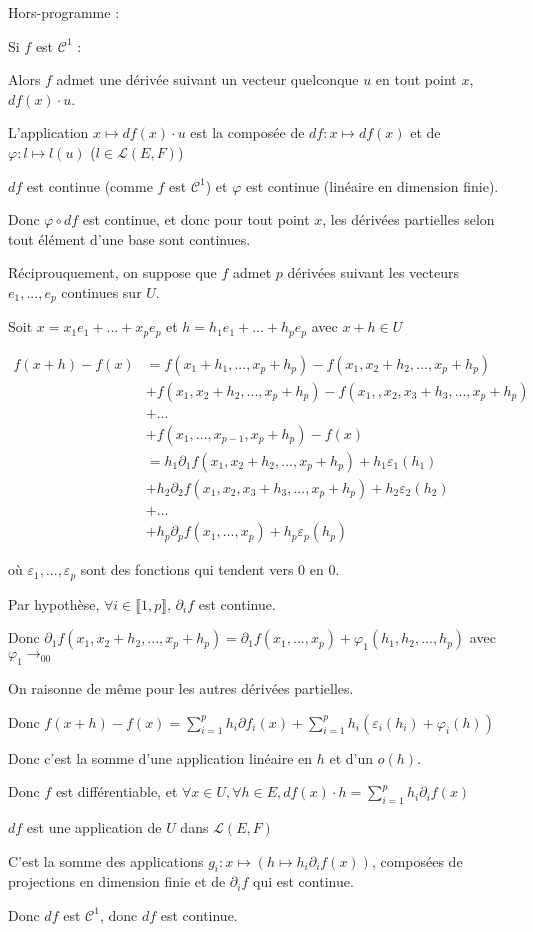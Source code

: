 \documentclass[a4paper,12pt]{book}
\newcommand{\Pre}[1]{\begin{tcolorbox}[sharp corners, colback=white,colframe=green!60!green!30!black!75, title=Preuve]#1\end{tcolorbox}}
\begin{document}
\Pre{Hors-programme :
\par Si $f$ est $\mathcal{C}^1$ :
\par Alors $f$ admet une dérivée suivant un vecteur quelconque $u$ en tout point $x$, $df(x)\cdot u$.
\par L'application $x\mapsto df(x)\cdot u$ est la composée de $df:x\mapsto df(x)$ et de $\varphi:l\mapsto l(u)$ ($l\in\mathcal{L}(E,F)$)
\par $df$ est continue (comme $f$ est $\mathcal{C}^1$) et $\varphi$ est continue (linéaire en dimension finie).
\par Donc $\varphi\circ df$ est continue, et donc pour tout point $x$, les dérivées partielles selon tout élément d'une base sont continues.
\par Réciprouquement, on suppose que $f$ admet $p$ dérivées suivant les vecteurs $e_1,..., e_p$ continues sur $U$.
\par Soit $x = x_1e_1+...+x_pe_p$ et $h=h_1e_1+...+h_pe_p$ avec $x+h\in U$
\par \begin{align*}f(x+h)-f(x)&= f(x_1+h_1,...,x_p+h_p) - f(x_1, x_2+h_2,..., x_p+h_p)\\
&+f(x_1, x_2+h_2,..., x_p+h_p) -f(x_1,, x_2, x_3+h_3, ...,x_p+h_p)\\
&+...\\
&+ f(x_1, ..., x_{p-1}, x_p+h_p) -f(x)\\
&= h_1\partial_1f(x_1, x_2+h_2,..., x_p+h_p) + h_1\varepsilon_1(h_1)\\
&+h_2\partial_2f(x_1, x_2,x_3+h_3,..., x_p+h_p) + h_2\varepsilon_2(h_2)\\
&+ ...\\
&+h_p\partial_pf(x_1,..., x_p)+h_p\varepsilon_p(h_p)
\end{align*}
\par où $\varepsilon_1,..., \varepsilon_p$ sont des fonctions qui tendent vers $0$ en $0$.
\par Par hypothèse, $\forall i\in\llbracket 1,p\rrbracket$, $\partial_if$ est continue.
\par Donc $\partial_1f(x_1,x_2+h_2,..., x_p+h_p) = \partial_1f(x_1,..., x_p)+\varphi_1(h_1, h_2,..., h_p)$ avec $\varphi_1\to_00$
\par On raisonne de même pour les autres dérivées partielles.
\par Donc $f(x+h)-f(x) =\sum\limits_{i=1}^ph_i\partial f_i(x) + \sum\limits_{i=1}^ph_i(\varepsilon_i(h_i) +\varphi_i(h))$
\par Donc c'est la somme d'une application linéaire en $h$ et d'un $o(h)$.
\par Donc $f$ est différentiable, et $\forall x\in U, \forall h\in E, df(x)\cdot h = \sum\limits_{i=1}^ph_i\partial_if(x)$
\par $df$ est une application de $U$ dans $\mathcal{L}(E,F)$
\par C'est la somme des applications $g_i:x\mapsto (h\mapsto h_i\partial_if(x))$, composées de projections en dimension finie et de $\partial_if$ qui est continue.
\par Donc $df$ est $\mathcal{C}^1$, donc $df$ est continue.}
\end{document}
